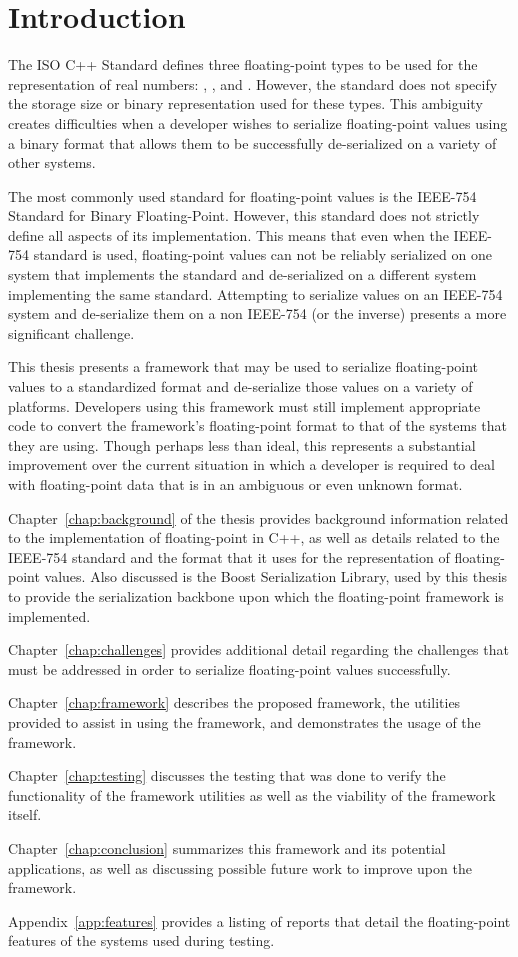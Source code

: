 \chapter{Introduction}
\label{chap:introduction}
The ISO C++ Standard defines three floating-point types to be used for the representation of real numbers: , , and . However, the standard does not specify the storage size or binary representation used for these types. This ambiguity creates difficulties when a developer wishes to serialize floating-point values using a binary format that allows them to be successfully de-serialized on a variety of other systems.

The most commonly used standard for floating-point values is the IEEE-754 Standard for Binary Floating-Point. However, this standard does not strictly define all aspects of its implementation. This means that even when the IEEE-754 standard is used, floating-point values can not be reliably serialized on one system that implements the standard and de-serialized on a different system implementing the same standard. Attempting to serialize values on an IEEE-754 system and de-serialize them on a non IEEE-754 (or the inverse) presents a more significant challenge.

This thesis presents a framework that may be used to serialize floating-point values to a standardized format and de-serialize those values on a variety of platforms. Developers using this framework must still implement appropriate code to convert the framework's floating-point format to that of the systems that they are using. Though perhaps less than ideal, this represents a substantial improvement over the current situation in which a developer is required to deal with floating-point data that is in an ambiguous or even unknown format.

Chapter~\ref{chap:background} of the thesis provides background information related to the implementation of floating-point in C++, as well as details related to the IEEE-754 standard and the format that it uses for the representation of floating-point values. Also discussed is the Boost Serialization Library, used by this thesis to provide the serialization backbone upon which the floating-point framework is implemented.

Chapter~\ref{chap:challenges} provides additional detail regarding the challenges that must be addressed in order to serialize floating-point values successfully.

Chapter~\ref{chap:framework} describes the proposed framework, the utilities provided to assist in using the framework, and demonstrates the usage of the framework.

Chapter~\ref{chap:testing} discusses the testing that was done to verify the functionality of the framework utilities as well as the viability of the framework itself.

Chapter~\ref{chap:conclusion} summarizes this framework and its potential applications, as well as discussing possible future work to improve upon the framework.

Appendix~\ref{app:features} provides a listing of reports that detail the floating-point features of the systems used during testing.